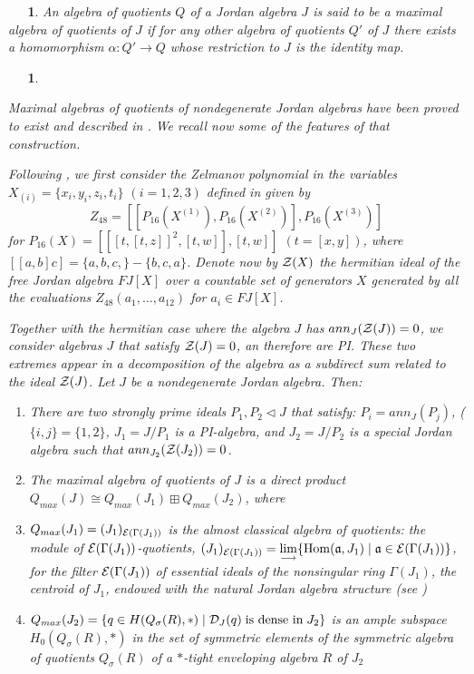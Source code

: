 \documentclass[a4paper,twoside,11pt]{article}
\theoremstyle{plain}
\theoremstyle{miestilo}
\theoremstyle{misnotas}
\newtheorem{apartado}[subsection]{\ {\ }}
\begin{document}
\begin{apartado}\label{def}  An algebra  of quotients $Q$ of a Jordan algebra $J$
is said to be a \emph{maximal  algebra of quotients} of $J$ if for
any other algebra of quotients $Q'$ of $J$ there exists a
homomorphism $\alpha: Q' \to Q$ whose restriction to $J$ is the
identity map.
\end{apartado}

\begin{apartado} \label{ampleher}

Maximal algebras of quotients of nondegenerate Jordan algebras have been proved to exist and described in \cite{densos}.  We recall now some of the features of that construction.

Following \cite[4.9]{densos}, we first consider the Zelmanov polynomial  in the variables $X_{(i)}= \{x_i,y_i,z_i,t_i\}$ $(i=1,2,3)$ defined in \cite[pp.192-195]{mcz} given by $$Z_{48}= [[P_{16}(X^{(1)}), P_{16}(X^{(2)})], P_{16}(X^{(3)})]$$
for $P_{16}(X) = [[[t,[t,z]]^2,[t,w]],[t,w]]$  $(t= [x,y])$, where $[[a,b]c]= \{a,b,c,\}-\{b,c,a\}$. Denote now by ${\cal Z}(X)$ the hermitian ideal of the free Jordan algebra $FJ[X]$ over a countable set of generators $X$ generated by all the evaluations $Z_{48}(a_1,\dots, a_{12})$ for $a_i\in FJ[X]$.

Together with the hermitian case where the algebra $J$ has $ann_{J}({\cal Z}(J))=0$, we consider algebras $J$ that satisfy ${\cal Z}(J)=0$, an therefore are PI. These two extremes appear in a decomposition of the algebra as a subdirect sum related to the ideal ${\cal Z}(J)$. Let $J$ be a nondegenerate Jordan algebra. Then:
\begin{enumerate}\item There are two strongly prime ideals $P_1, P_2\triangleleft J$ that satisfy:
 $P_i= ann_J(P_j)$, ($\{i,j\}= \{1,2\}$, $J_1= J/P_1$ is a PI-algebra, and  $J_2=J/P_2$ is a special Jordan algebra such that $ann_{J_2}({\cal Z}(J_2))=0$.
 \item The maximal algebra of 	quotients of $J$ is a direct product $Q_{max}(J)\cong Q_{max}(J_1)\boxplus Q_{max}(J_2)$, where
 \item $Q_{max}(J_1) = (J_1)_{{\cal E}(\Gamma(J_1))}$ is the almost classical algebra of quotients: the module of $\mathcal E(\Gamma(J_1))$-quotients, $(J_1)_{\mathcal E(\Gamma(J_1))} = \displaystyle\lim_{\longrightarrow}\{{\rm Hom}({\frak a}, J_1)\mid {\frak a} \in \mathcal E(\Gamma(J_1))\}$, for the filter $\mathcal E(\Gamma(J_1))$ of essential ideals of the nonsingular ring $\Gamma(J_1)$, the centroid of $J_1$, endowed with the natural Jordan algebra structure (see \cite[Theorem 3.11]{densos})
 \item $Q_{max}(J_2) = \{q\in H(Q_\sigma(R),\ast) \mid {\cal D}_J(q)  \; \hbox{\rm is dense in} \; J_2 \}$ is an ample subspace $H_0(Q_\sigma(R),\ast)$ in the set of symmetric elements of the symmetric algebra of quotients $Q_\sigma(R)$ of a $\ast$-tight enveloping algebra $R$ of $J_2$



\end{enumerate}
\end{apartado}
\end{document}
